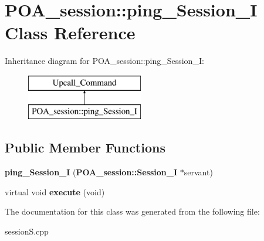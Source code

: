 \section{P\+O\+A\+\_\+session\+:\+:ping\+\_\+\+Session\+\_\+I Class Reference}
\label{classPOA__session_1_1ping__Session__I}
Inheritance diagram for P\+O\+A\+\_\+session\+:\+:ping\+\_\+\+Session\+\_\+I\+:\begin{figure}[H]
\begin{center}
\leavevmode
\includegraphics[height=2.000000cm]{classPOA__session_1_1ping__Session__I}
\end{center}
\end{figure}
\subsection*{Public Member Functions}
\begin{DoxyCompactItemize}
\item 
{\bfseries ping\+\_\+\+Session\+\_\+I} ({\bf P\+O\+A\+\_\+session\+::\+Session\+\_\+I} $\ast$servant)\label{classPOA__session_1_1ping__Session__I_a91cc8b31fca949222d6884322c88e6c3}

\item 
virtual void {\bfseries execute} (void)\label{classPOA__session_1_1ping__Session__I_a72a10889ee3bad25bbce101d033d1131}

\end{DoxyCompactItemize}


The documentation for this class was generated from the following file\+:\begin{DoxyCompactItemize}
\item 
session\+S.\+cpp\end{DoxyCompactItemize}

